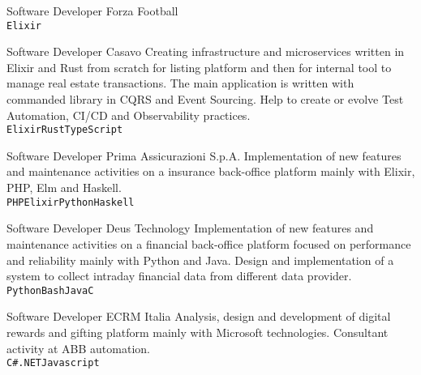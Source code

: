 \documentclass[9pt]{developercv}
\begin{document}
\begin{entrylist}
		{Software Developer}
		{Forza Football}
		{\\
	   \texttt{Elixir}}

		{Software Developer}
		{Casavo}
		{Creating infrastructure and microservices written in Elixir and Rust from scratch for listing platform and then for internal tool to manage real estate transactions. The main application is written with commanded library in CQRS and Event Sourcing. Help to create or evolve Test Automation, CI/CD and Observability practices.\\
	   \texttt{Elixir}\slashsep\texttt{Rust}\slashsep\texttt{TypeScript}}

		{Software Developer}
		{Prima Assicurazioni S.p.A.}
		{Implementation of new features and maintenance activities on a insurance back-office platform mainly with Elixir, PHP, Elm and Haskell. \\ \texttt{PHP}\slashsep\texttt{Elixir}\slashsep\texttt{Python}\slashsep\texttt{Haskell}}

		{Software Developer}
		{Deus Technology}
		{Implementation of new features and maintenance activities on a financial back-office platform focused on performance and reliability mainly with Python and Java. Design and implementation of a system to collect intraday financial data from different data provider. \\ \texttt{Python}\slashsep\texttt{Bash}\slashsep\texttt{Java}\slashsep\texttt{C}}

		{Software Developer}
		{ECRM Italia}
		{Analysis, design and development of digital rewards and gifting platform mainly with Microsoft technologies. Consultant activity at ABB automation. \\
	   \texttt{C\#}\slashsep\texttt{.NET}\slashsep\texttt{Javascript}}


\end{entrylist}
\end{document}
